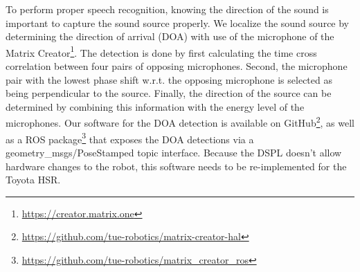 To perform proper speech recognition, knowing the direction of the sound is important to capture the sound source properly. We localize the sound source by determining the direction of arrival (DOA) with use of the microphone of the Matrix Creator\footnote{\url{https://creator.matrix.one}}.
The detection is done by first calculating the time cross correlation between four pairs of opposing microphones. Second, the microphone pair with the lowest phase shift w.r.t. the opposing microphone is selected as being perpendicular to the source. Finally, the direction of the source can be determined by combining this information with the energy level of the microphones. Our software for the DOA detection is available on GitHub\footnote{\url{https://github.com/tue-robotics/matrix-creator-hal}}, as well as a ROS package\footnote{\url{https://github.com/tue-robotics/matrix_creator_ros}} that exposes the DOA detections via a geometry\_msgs/PoseStamped topic interface.
Because the DSPL doesn't allow hardware changes to the robot, this software needs to be re-implemented for the Toyota HSR.
